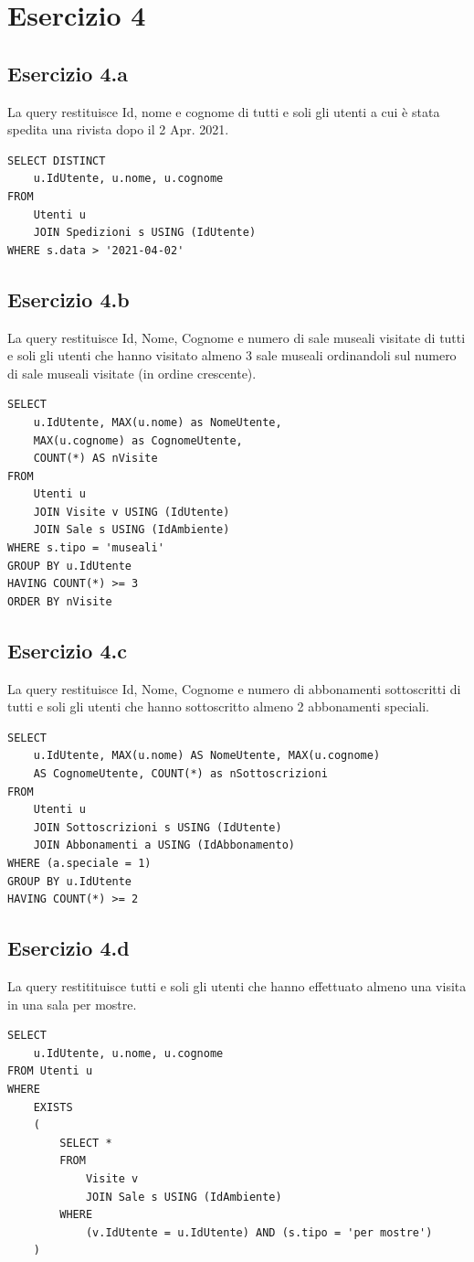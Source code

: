 \documentclass[10pt, italian, openany, landscape, fleqn]{book}
\begin{document}
\section{Esercizio 4}
\subsection*{Esercizio 4.a}
La query restituisce Id, nome e cognome di tutti e soli gli utenti a cui \`e stata spedita una rivista dopo il 2 Apr. 2021.
\begin{lstlisting}[style=sql]
SELECT DISTINCT
    u.IdUtente, u.nome, u.cognome
FROM
    Utenti u
    JOIN Spedizioni s USING (IdUtente)
WHERE s.data > '2021-04-02'
\end{lstlisting}
\subsection*{Esercizio 4.b}
La query restituisce Id, Nome, Cognome e numero di sale museali visitate di tutti e soli gli utenti
che hanno visitato almeno 3 sale museali ordinandoli sul numero di sale museali visitate (in ordine crescente).
\begin{lstlisting}[style=sql]
SELECT
    u.IdUtente, MAX(u.nome) as NomeUtente, 
    MAX(u.cognome) as CognomeUtente,
    COUNT(*) AS nVisite
FROM
    Utenti u
    JOIN Visite v USING (IdUtente)
    JOIN Sale s USING (IdAmbiente)
WHERE s.tipo = 'museali'
GROUP BY u.IdUtente
HAVING COUNT(*) >= 3
ORDER BY nVisite
\end{lstlisting}
\pagebreak
\subsection*{Esercizio 4.c}
La query restituisce Id, Nome, Cognome e numero di abbonamenti sottoscritti di tutti e soli
gli utenti che hanno sottoscritto almeno 2 abbonamenti speciali.
\begin{lstlisting}[style=sql]
SELECT
    u.IdUtente, MAX(u.nome) AS NomeUtente, MAX(u.cognome)
    AS CognomeUtente, COUNT(*) as nSottoscrizioni
FROM
    Utenti u
    JOIN Sottoscrizioni s USING (IdUtente)
    JOIN Abbonamenti a USING (IdAbbonamento)
WHERE (a.speciale = 1)
GROUP BY u.IdUtente
HAVING COUNT(*) >= 2
\end{lstlisting}
\subsection*{Esercizio 4.d}
La query restitituisce tutti e soli gli utenti che hanno effettuato almeno una visita
in una sala per mostre.
\begin{lstlisting}[style=sql]
SELECT
    u.IdUtente, u.nome, u.cognome
FROM Utenti u
WHERE
    EXISTS
    (
        SELECT *
        FROM
            Visite v
            JOIN Sale s USING (IdAmbiente)
        WHERE
            (v.IdUtente = u.IdUtente) AND (s.tipo = 'per mostre')
    )
\end{lstlisting}
\pagebreak
\end{document}
